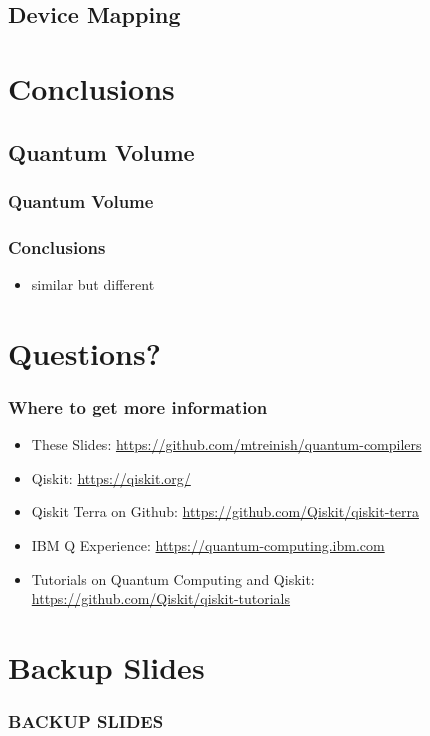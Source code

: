 \documentclass[aspectratio=169,11pt,hyperref={colorlinks=true}]{beamer}
\begin{document}
\subsection{Device Mapping}

\section{Conclusions}
\subsection{Quantum Volume}
\begin{frame}
    \frametitle{Quantum Volume\footnotemark[1]}

    \vspace{3em}
\end{frame}
\begin{frame}
    \frametitle{Conclusions}
    \begin{itemize}
        \item similar but different
    \end{itemize}
\end{frame}

\section{Questions?}
\begin{frame}
\frametitle{Where to get more information}
    \begin{itemize}
        \item These Slides: \href{https://github.com/mtreinish/quantum-compilers}{https://github.com/mtreinish/quantum-compilers}
        \item Qiskit: \href{https://qiskit.org/}{https://qiskit.org/}
        \item Qiskit Terra on Github: \href{https://github.com/Qiskit/qiskit-terra}{https://github.com/Qiskit/qiskit-terra}
        \item IBM Q Experience: \href{https://quantum-computing.ibm.com}{https://quantum-computing.ibm.com}
        \item Tutorials on Quantum Computing and Qiskit: \href{https://github.com/Qiskit/qiskit-tutorials}{https://github.com/Qiskit/qiskit-tutorials}
    \end{itemize}
\end{frame}

\section{Backup Slides}
\begin{frame}[noframenumbering]
    \frametitle{BACKUP SLIDES}
\end{frame}
\end{document}
